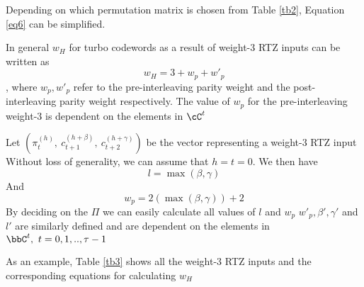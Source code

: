 \documentclass[11pt, oneside, dvipdfmx]{book}
\begin{document}
Depending on which permutation matrix is chosen from Table \ref{tb2}, Equation \ref{eq6} can be simplified. 

In general $w_H$ for turbo codewords as a result of weight-$3$ RTZ inputs can be written as $$w_H=3 + w_p+ w'_p$$, where $w_p,w'_p$ refer to the pre-interleaving parity weight and the post-interleaving parity weight respectively. The value of $w_p$ for the pre-interleaving weight-$3$ is dependent on the elements in $\cC^t$

Let $(\pi^{(h)}_{t},~c^{(h+\beta)}_{t+1},~c^{(h+\gamma)}_{t+2})$ be the vector representing a weight-$3$ RTZ input
Without loss of generality, we can assume that $h =t =0$. We then have 
\begin{equation}
l=\max{(\beta,\gamma)}
\label{eq8}
\end{equation}
And 
\begin{equation}
w_p=
2(\max{(\beta,\gamma)})+2
\label{eq9}
\end{equation}
By deciding on the $\Pi$ we can easily calculate all values of $l$ and $w_p$
$w'_p,\beta',\gamma' $ and $l'$ are similarly defined and are dependent on the elements in $\bbC^{t},~t=0,1,..,\tau-1$

As an example, Table \ref{tb3} shows all the weight-$3$ RTZ inputs and the corresponding equations for calculating $w_H$
\end{document}
